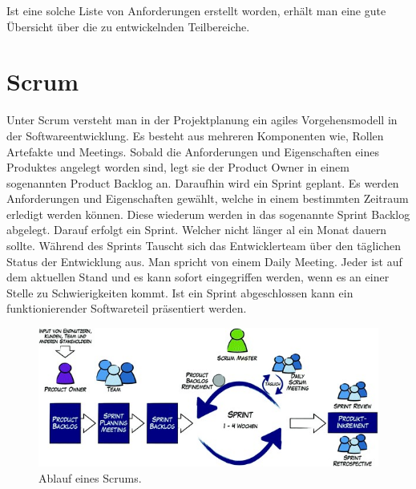 Ist eine solche Liste von Anforderungen erstellt worden, erhält man eine gute Übersicht über die zu entwickelnden Teilbereiche.



\section{Scrum}
\label{scrum}

Unter Scrum versteht man in der Projektplanung ein agiles Vorgehensmodell in der Softwareentwicklung. Es besteht aus mehreren Komponenten wie, Rollen Artefakte und Meetings. Sobald die Anforderungen und Eigenschaften eines Produktes angelegt worden sind, legt sie der Product Owner in einem sogenannten Product Backlog an. Daraufhin wird ein Sprint geplant. Es werden Anforderungen und Eigenschaften gewählt, welche in einem bestimmten Zeitraum erledigt werden können. Diese wiederum werden in das sogenannte Sprint Backlog abgelegt. Darauf erfolgt ein Sprint. Welcher nicht länger al ein Monat dauern sollte. Während des Sprints Tauscht sich das Entwicklerteam über den täglichen Status der Entwicklung aus. Man spricht von einem Daily Meeting. Jeder ist auf dem aktuellen Stand und es kann sofort eingegriffen werden, wenn es an einer Stelle zu Schwierigkeiten kommt. Ist ein Sprint abgeschlossen kann ein funktionierender Softwareteil präsentiert werden. \autocite{Niermann.2017}

\begin{figure}[bh]
	\centering
	\includegraphics[scale=0.95]{content/pictures/scrum.jpg}
	\caption{Ablauf eines Scrums. \cite{Niermann.2017}}
	\label{fig:scrum}
\end{figure}

